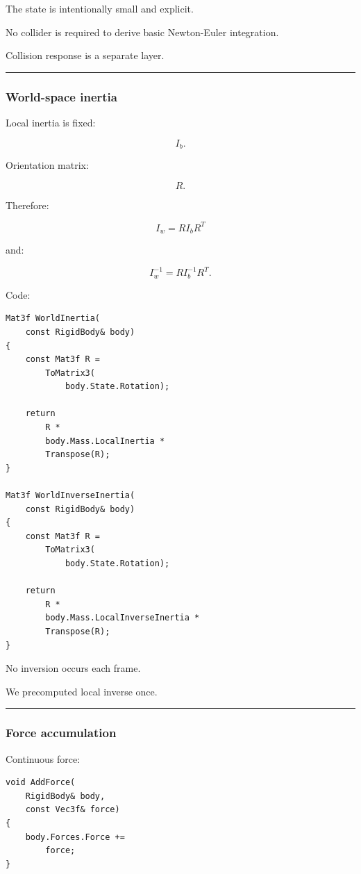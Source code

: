 The state is intentionally small and explicit.

No collider is required to derive basic Newton-Euler integration.

Collision response is a separate layer.

\begin{center}\rule{0.5\linewidth}{0.5pt}\end{center}

\subsubsection{World-space inertia}\label{world-space-inertia}

Local inertia is fixed:

\[
I_b.
\]

Orientation matrix:

\[
R.
\]

Therefore:

\[
\boxed{
I_w
=
RI_bR^T
}
\]

and:

\[
\boxed{
I_w^{-1}
=
RI_b^{-1}R^T.
}
\]

Code:

\begin{verbatim}
Mat3f WorldInertia(
    const RigidBody& body)
{
    const Mat3f R =
        ToMatrix3(
            body.State.Rotation);

    return
        R *
        body.Mass.LocalInertia *
        Transpose(R);
}

Mat3f WorldInverseInertia(
    const RigidBody& body)
{
    const Mat3f R =
        ToMatrix3(
            body.State.Rotation);

    return
        R *
        body.Mass.LocalInverseInertia *
        Transpose(R);
}
\end{verbatim}

No inversion occurs each frame.

We precomputed local inverse once.

\begin{center}\rule{0.5\linewidth}{0.5pt}\end{center}

\subsubsection{Force accumulation}\label{force-accumulation}

Continuous force:

\begin{verbatim}
void AddForce(
    RigidBody& body,
    const Vec3f& force)
{
    body.Forces.Force +=
        force;
}
\end{verbatim}

